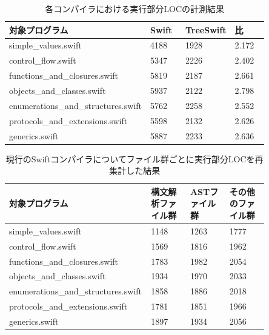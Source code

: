 \begin{table}[!hbtp]
    \begin{center}
        \caption{各コンパイラにおける実行部分LOCの計測結果}
        \begin{tabular}{|p{0.4\linewidth}|p{0.15\linewidth}|p{0.15\linewidth}|p{0.15\linewidth}|}
            \hline
            対象プログラム & Swift & TreeSwift & 比\\
            \hline
            \hline
            simple\_values.swift & 4188 & 1928 & 2.172\\
            \hline
            control\_flow.swift & 5347 & 2226 & 2.402\\
            \hline
            functions\_and\_closures.swift & 5819 & 2187 & 2.661\\
            \hline
            objects\_and\_classes.swift & 5937 & 2122 & 2.798\\
            \hline
            enumerations\_and\_structures.swift & 5762 & 2258 & 2.552\\
            \hline
            protocols\_and\_extensions.swift & 5598 & 2132 & 2.626\\
            \hline
            generics.swift & 5887 & 2233 & 2.636\\
            \hline
        \end{tabular}
        \label{table:loc-result}
    \end{center}
\end{table}

\begin{table}[!hbtp]
    \begin{center}
        \caption{現行のSwiftコンパイラについてファイル群ごとに実行部分LOCを再集計した結果}
        \begin{tabular}{|p{0.4\linewidth}|p{0.15\linewidth}|p{0.15\linewidth}|p{0.15\linewidth}|}
            \hline
            対象プログラム & 構文解析ファイル群 & ASTファイル群 & その他のファイル群\\
            \hline
            \hline
            simple\_values.swift & 1148 & 1263 & 1777\\
            \hline
            control\_flow.swift & 1569 & 1816 & 1962\\
            \hline
            functions\_and\_closures.swift & 1783 & 1982 & 2054\\
            \hline
            objects\_and\_classes.swift & 1934 & 1970 & 2033\\
            \hline
            enumerations\_and\_structures.swift & 1858 & 1886 & 2018\\
            \hline
            protocols\_and\_extensions.swift & 1781 & 1851 & 1966\\
            \hline
            generics.swift & 1897 & 1934 & 2056\\
            \hline
        \end{tabular}
        \label{table:loc-swift-per-file}
    \end{center}
\end{table}

